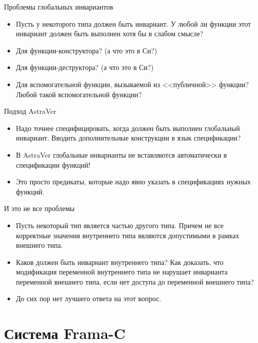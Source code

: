 \documentclass[hyperref={unicode=true}]{beamer}
\begin{document}
    \begin{frame}{Проблемы глобальных инвариантов}
    \begin{itemize}
    \item
    Пусть у некоторого типа должен быть инвариант.
    У любой ли функции этот инвариант должен быть
    выполнен хотя бы в слабом смысле?
    \item
    Для функции-конструктора? (а что это в Си?)
    \item
    Для функции-деструктора? (а что это в Си?)
    \item
    Для вспомогательной функции, вызываемой из
    <<публичной>> функции? Любой такой вспомогательной
    функции?
    \end{itemize}
    \end{frame}

    \begin{frame}{Подход AstraVer}
    \begin{itemize}
    \item
    Надо точнее специфицировать, когда должен быть
    выполнен глобальный инвариант. Вводить дополнительные
    конструкции в язык спецификации?
    \item
    В AstraVer глобальные инварианты не
    вставляются автоматически в спецификации функций!
    \item
    Это просто предикаты, которые надо явно
    указать в спецификациях нужных функций.
    \end{itemize}
    \end{frame}

    \begin{frame}{И это не все проблемы}
    \begin{itemize}
    \item
    Пусть некоторый тип является частью другого типа.
    Причем не все корректные значения внутреннего
    типа являются допустимыми в рамках внешнего типа.
    \item
    Каков должен быть инвариант внутреннего типа?
    Как доказать, что модификация переменной
    внутреннего типа не нарушает инварианта
    переменной внешнего типа, если нет доступа
    до переменной внешнего типа?
    \item
    До сих пор нет лучшего ответа на этот вопрос.
    \end{itemize}
    \end{frame}

    \section{Система Frama-C}
\end{document}
